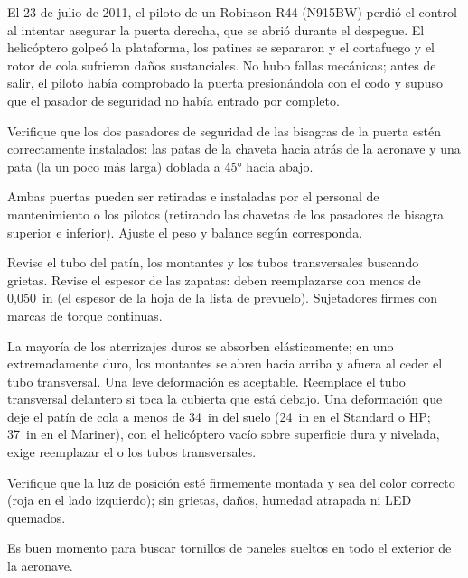 \begin{caso}
El 23 de julio de 2011, el piloto de un Robinson R44 (N915BW) perdió el control al intentar asegurar la puerta derecha, que se abrió durante el despegue. El helicóptero golpeó la plataforma, los patines se separaron y el cortafuego y el rotor de cola sufrieron daños sustanciales. No hubo fallas mecánicas; antes de salir, el piloto había comprobado la puerta presionándola con el codo y supuso que el pasador de seguridad no había entrado por completo.
\end{caso}

Verifique que los dos pasadores de seguridad de las bisagras de la puerta estén correctamente instalados: las patas de la chaveta hacia atrás de la aeronave y una pata (la un poco más larga) doblada a 45° hacia abajo.

\begin{nota}
Ambas puertas pueden ser retiradas e instaladas por el personal de mantenimiento o los pilotos (retirando las chavetas de los pasadores de bisagra superior e inferior). Ajuste el peso y balance según corresponda.
\end{nota}

Revise el tubo del patín, los montantes y los tubos transversales buscando grietas. Revise el espesor de las zapatas: deben reemplazarse con menos de 0,050~in (el espesor de la hoja de la lista de prevuelo). Sujetadores firmes con marcas de torque continuas.

\begin{nota}
La mayoría de los aterrizajes duros se absorben elásticamente; en uno extremadamente duro, los montantes se abren hacia arriba y afuera al ceder el tubo transversal. Una leve deformación es aceptable. Reemplace el tubo transversal delantero si toca la cubierta que está debajo. Una deformación que deje el patín de cola a menos de 34~in del suelo (24~in en el Standard o HP; 37~in en el Mariner), con el helicóptero vacío sobre superficie dura y nivelada, exige reemplazar el o los tubos transversales.
\end{nota}

Verifique que la luz de posición esté firmemente montada y sea del color correcto (roja en el lado izquierdo); sin grietas, daños, humedad atrapada ni LED quemados.

\begin{nota}
Es buen momento para buscar tornillos de paneles sueltos en todo el exterior de la aeronave.
\end{nota}

